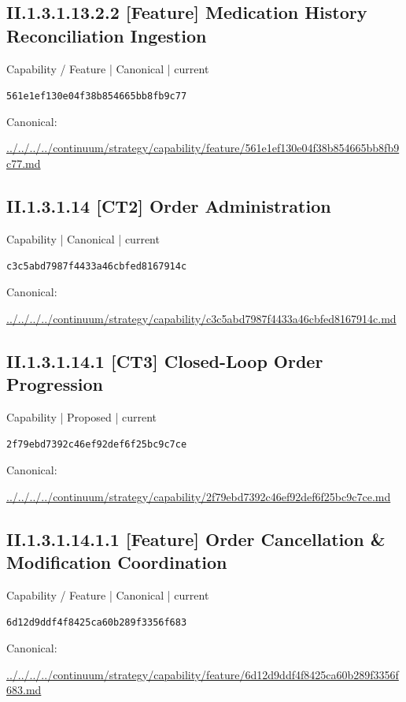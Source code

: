 \documentclass[10pt,a4paper]{article}
\begin{document}
\subsection*{II.1.3.1.13.2.2 [Feature] Medication History Reconciliation Ingestion}
{\small Capability / Feature | Canonical | current}\par
\texttt{561e1ef130e04f38b854665bb8fb9c77}\par
Canonical: \par
{\footnotesize\url{../../../../continuum/strategy/capability/feature/561e1ef130e04f38b854665bb8fb9c77.md}}\par
\subsection*{II.1.3.1.14 [CT2] Order Administration}
{\small Capability | Canonical | current}\par
\texttt{c3c5abd7987f4433a46cbfed8167914c}\par
Canonical: \par
{\footnotesize\url{../../../../continuum/strategy/capability/c3c5abd7987f4433a46cbfed8167914c.md}}\par
\subsection*{II.1.3.1.14.1 [CT3] Closed-Loop Order Progression}
{\small Capability | Proposed | current}\par
\texttt{2f79ebd7392c46ef92def6f25bc9c7ce}\par
Canonical: \par
{\footnotesize\url{../../../../continuum/strategy/capability/2f79ebd7392c46ef92def6f25bc9c7ce.md}}\par
\subsection*{II.1.3.1.14.1.1 [Feature] Order Cancellation \& Modification Coordination}
{\small Capability / Feature | Canonical | current}\par
\texttt{6d12d9ddf4f8425ca60b289f3356f683}\par
Canonical: \par
{\footnotesize\url{../../../../continuum/strategy/capability/feature/6d12d9ddf4f8425ca60b289f3356f683.md}}\par
\end{document}
